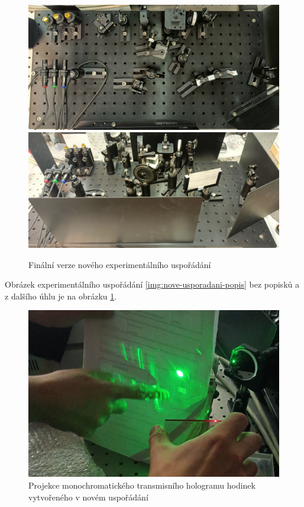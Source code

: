 \documentclass[twoside,project]{../MFFPrace}
\begin{document}
\begin{figure}[htp]
    \centering
    \includegraphics[width=\linewidth]{../img/nove-usporadani-shora.jpg}
    \includegraphics[width=\linewidth]{../img/nove-usporadani-uhel.jpg}
    \caption{Finální verze nového experimentálního uspořádání}
    \label{img:nove-usporadani}
\end{figure}

Obrázek experimentálního uspořádání \ref{img:nove-usporadani-popis} bez popisků a z dalšího úhlu je na obrázku \ref{img:nove-usporadani}.

\begin{figure}
    \centering
    \includegraphics[width=\linewidth]{../img/hologram-t-projekce.jpg}
    \caption{Projekce monochromatického transmisního hologramu hodinek vytvořeného v novém uspořádání}
    \label{img:transmisni}
\end{figure}
\end{document}
